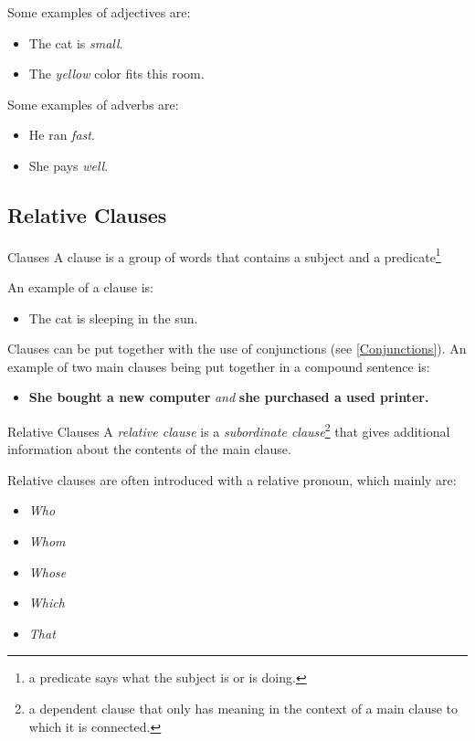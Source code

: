 Some examples of adjectives are:

\begin{itemize}
    \item The cat is \textit{small}.
    \item The \textit{yellow} color fits this room.
\end{itemize}

Some examples of adverbs are:

\begin{itemize}
    \item He ran \textit{fast}.
    \item She pays \textit{well}.
\end{itemize}

\newpage
\subsection{Relative Clauses}
\begin{definition}{Clauses}{}
    A clause is a group of words that contains a subject and a predicate\footnote{a predicate says what the subject is or is doing.}
\end{definition}
An example of a clause is:

\begin{itemize}
    \item The cat is sleeping in the sun.
\end{itemize}

Clauses can be put together with the use of conjunctions (see \ref{Conjunctions}). An example of two main clauses being put together in a compound sentence is:

\begin{itemize}
    \item \textbf{She bought a new computer} \textit{and} \textbf{she purchased a used printer.}
\end{itemize}

\begin{definition}{Relative Clauses}{}
    A \textit{relative clause} is a \textit{subordinate clause}\footnote{a dependent clause that only has meaning in the context of a main clause to which it is connected.} that gives additional information about the contents of the main clause.
\end{definition}

Relative clauses are often introduced with a relative pronoun, which mainly are:

\begin{itemize}
    \item \textit{Who} 
    \item \textit{Whom} 
    \item \textit{Whose} 
    \item \textit{Which} 
    \item \textit{That} 
\end{itemize}

